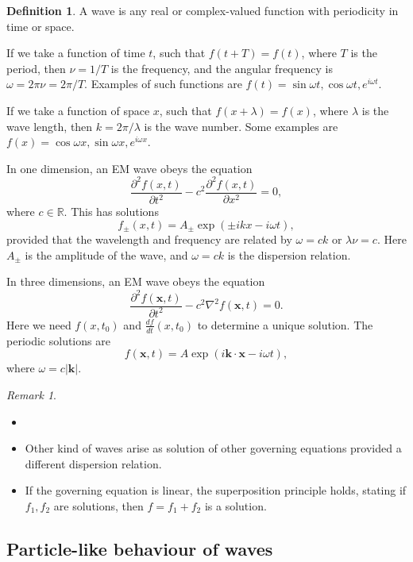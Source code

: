 \documentclass[12pt]{article}
\theoremstyle{definition}
\newtheorem{definition}{Definition}[section]
\theoremstyle{remark}
\newtheorem*{remark}{Remark}
\begin{document}
\begin{definition}
	A wave is any real or complex-valued function with periodicity in time or space.
\end{definition}

If we take a function of time $t$, such that $f(t + T) = f(t)$, where $T$ is the period, then $\nu = 1/T$ is the frequency, and the angular frequency is $\omega = 2 \pi \nu = 2 \pi/T$. Examples of such functions are $f(t) = \sin \omega t, \cos \omega t, e^{i \omega t}$.

If we take a function of space $x$, such that $f(x + \lambda) = f(x)$, where $\lambda$ is the wave length, then $k = 2 \pi/\lambda$ is the wave number. Some examples are $f(x) = \cos \omega x, \sin \omega x, e^{i \omega x}$.

In one dimension, an EM wave obeys the equation
\[
	\frac{\partial^2 f(x, t)}{\partial t^2} - c^2 \frac{\partial^2 f(x, t)}{\partial x^2} = 0
,\]
where $c \in \mathbb{R}$. This has solutions
\[
	f_{\pm}(x, t) = A_{\pm} \exp(\pm ikx - i\omega t)
,\]
provided that the wavelength and frequency are related by $\omega = ck$ or $\lambda \nu = c$. Here $A_{\pm}$ is the amplitude of the wave, and $\omega = ck$ is the dispersion relation.

In three dimensions, an EM wave obeys the equation
\[
	\frac{\partial^2 f(\mathbf{x}, t)}{\partial t^2} - c^2 \nabla^2 f(\mathbf{x}, t) = 0
.\]
Here we need $f(x, t_0)$ and $\frac{df}{dt} (x, t_0)$ to determine a unique solution. The periodic solutions are
\[
	f(\mathbf{x}, t) = A \exp(i \mathbf{k} \cdot \mathbf{x} - i \omega t)
,\]
where $\omega = c |\mathbf{k}|$.

\begin{remark}
	\begin{itemize}[(i)]
		\item[]
		\item Other kind of waves arise as solution of other governing equations provided a different dispersion relation.
		\item If the governing equation is linear, the superposition principle holds, stating if $f_1, f_2$ are solutions, then $f = f_1 + f_2$ is a solution.
	\end{itemize}
	
\end{remark}

\subsection{Particle-like behaviour of waves}%
\label{sub:particle_like_behaviour_of_waves}
\end{document}
